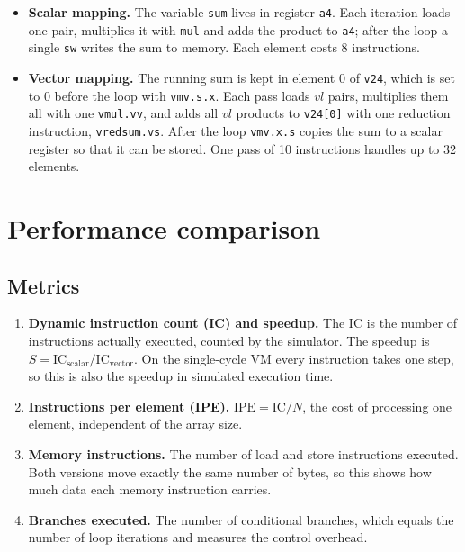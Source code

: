 \documentclass[11pt,a4paper]{article}
\newcommand{\code}[1]{\texttt{#1}}
\begin{document}
\begin{itemize}
  \item \textbf{Scalar mapping.} The variable \code{sum} lives in register \code{a4}. Each
        iteration loads one pair, multiplies it with \code{mul} and adds the product to \code{a4};
        after the loop a single \code{sw} writes the sum to memory. Each element costs 8
        instructions.
  \item \textbf{Vector mapping.} The running sum is kept in element 0 of \code{v24}, which is
        set to 0 before the loop with \code{vmv.s.x}. Each pass loads $vl$ pairs, multiplies them
        all with one \code{vmul.vv}, and adds all $vl$ products to \code{v24[0]} with one
        reduction instruction, \code{vredsum.vs}. After the loop \code{vmv.x.s} copies the sum to a
        scalar register so that it can be stored. One pass of 10 instructions handles up to 32
        elements.
\end{itemize}

\section{Performance comparison}

\subsection{Metrics}

\begin{enumerate}
  \item \textbf{Dynamic instruction count (IC) and speedup.} The IC is the number of instructions
        actually executed, counted by the simulator. The speedup is
        $S = \mathrm{IC}_{\text{scalar}} / \mathrm{IC}_{\text{vector}}$. On the single-cycle VM every
        instruction takes one step, so this is also the speedup in simulated execution time.
  \item \textbf{Instructions per element (IPE).} $\mathrm{IPE} = \mathrm{IC}/N$, the cost of
        processing one element, independent of the array size.
  \item \textbf{Memory instructions.} The number of load and store instructions executed. Both
        versions move exactly the same number of bytes, so this shows how much data each memory
        instruction carries.
  \item \textbf{Branches executed.} The number of conditional branches, which equals the number of
        loop iterations and measures the control overhead.
\end{enumerate}
\end{document}
